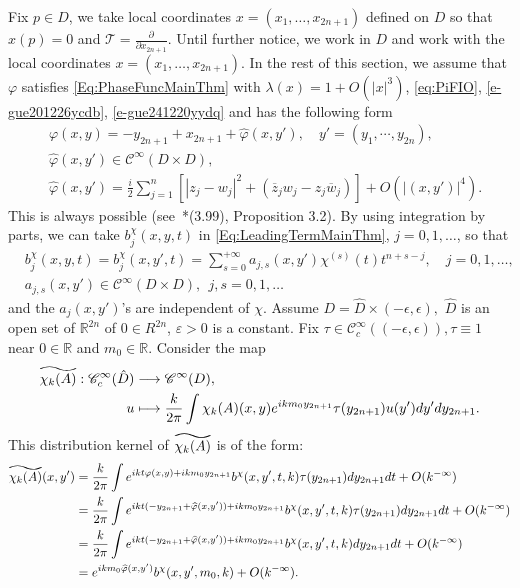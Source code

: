 \documentclass[12pt]{amsart}
\theoremstyle{definition}
\theoremstyle{named}
\numberwithin{equation}{subsection}
\newcommand{\R}{\mathbb{R}}
\newcommand{\pr}{\partial}
\newcommand{\abs}[1]{\left\vert#1\right\vert}
\def\cC{\mathscr{C}}
\newcommand\reallywidetilde[1]{\ThisStyle{%
  \setbox0=\hbox{$\SavedStyle#1$}%
  \stackengine{-.1\LMpt}{$\SavedStyle#1$}{%
    \stretchto{\scaleto{\SavedStyle\mkern.2mu\AC}{.5150\wd0}}{.6\ht0}%
  }{O}{c}{F}{T}{S}%
}}
\begin{document}
Fix $p\in D$, we take local coordinates $x=(x_1,\ldots,x_{2n+1})$ defined on $D$ so that $x(p)=0$ and $\mathcal{T}=\frac{\pr}{\pr x_{2n+1}}$. Until further notice, we work in $D$ and work with the local coordinates $x=(x_1,\ldots,x_{2n+1})$.
In the rest of this section, we assume that $\varphi$ satisfies \eqref{Eq:PhaseFuncMainThm} with $\lambda(x)=1+O(\abs{x}^3)$, \eqref{eq:PiFIO}, \eqref{e-gue201226ycdb}, \eqref{e-gue241220yydq} and has the following form 
\begin{equation}\label{eqn:ThmI2}
\begin{split}
    &\varphi(x,y)=-y_{2n+1}+x_{2n+1}+\hat\varphi(x,y'),\quad y'=(y_1,\cdots,y_{2n}),\\
    &\hat\varphi(x,y')\in\cC^\infty(D\times D),\\
    &\hat\varphi(x,y')=\frac{i}{2}\sum_{j=1}^n\left[|z_j-w_j|^2+(\overline{z}_jw_j-z_j\overline{w}_j)\right]+O\left(|(x,y')|^4\right).
    \end{split}
\end{equation}
This is always possible (see~\cite{Hsiao_Shen_2nd_coefficient_BS_2020}*{(3.99), Proposition 3.2}).  
By using integration by parts, we can take $b^\chi_j(x,y,t)$ in \eqref{Eq:LeadingTermMainThm}, $j=0,1,\ldots$, so that 
\begin{equation} \label{e-gue241128yydz}
\begin{split}
&b^\chi_j(x,y,t)=b^\chi_j(x,y',t)=\sum^{+\infty}_{s=0}a_{j,s}(x,y')\chi^{(s)}(t)t^{n+s-j},\quad j=0,1,\ldots,\\
     &a_{j,s}(x,y')\in\cC^\infty(D\times D),\ \ j,s=0,1,\ldots
     \end{split}
     \end{equation}
and the \(a_j(x,y')\)'s are independent of \(\chi\).
Assume $D=\widehat{D}\times(-\epsilon,\epsilon),$ $\widehat{D}$ is an open set of $\R^{2n}$ of $0\in R^{2n}$, $\varepsilon>0$ is a constant.
Fix $\tau\in\cC^{\infty}_c((-\epsilon,\epsilon)), \tau\equiv 1$ near $0\in\mathbb R$ and $m_0\in\mathbb R$. Consider the map 
\begin{align*}
    \reallywidetilde{\chi_k(A)}:\cC^{\infty}_{c}(\hat D)&\longrightarrow\cC^{\infty}(D),\\
    u&\longmapsto\frac{k}{2\pi}\int\chi_k(A)(x,y)e^{ikm_0y_{2n+1}}\tau(y_{2n+1})u(y')dy'dy_{2n+1}.
\end{align*}
This distribution kernel of $\reallywidetilde{\chi_k(A)}$ is of the form:
\begin{equation}\label{eqn:ThmI3}
\begin{split}
    \reallywidetilde{\chi_k(A)}(x,y')&=\frac{k}{2\pi}\int e^{ikt\varphi(x,y)+ikm_0y_{2n+1}}b^\chi(x,y',t,k)\tau(y_{2n+1})dy_{2n+1}dt+O(k^{-\infty})\\
    &=\frac{k}{2\pi}\int e^{ikt(-y_{2n+1}+\widehat{\varphi}(x,y'))+ikm_0y_{2n+1}}b^\chi(x,y',t,k)\tau(y_{2n+1})dy_{2n+1}dt+O(k^{-\infty})\\
    &=\frac{k}{2\pi}\int e^{ikt(-y_{2n+1}+\widehat{\varphi}(x,y'))+ikm_0y_{2n+1}}b^\chi(x,y',t,k)dy_{2n+1}dt+O(k^{-\infty})\\
    &=e^{ikm_0\widehat{\varphi}(x,y')}b^\chi(x,y',m_0,k)+O(k^{-\infty}). \end{split}
\end{equation} 
\end{document}
